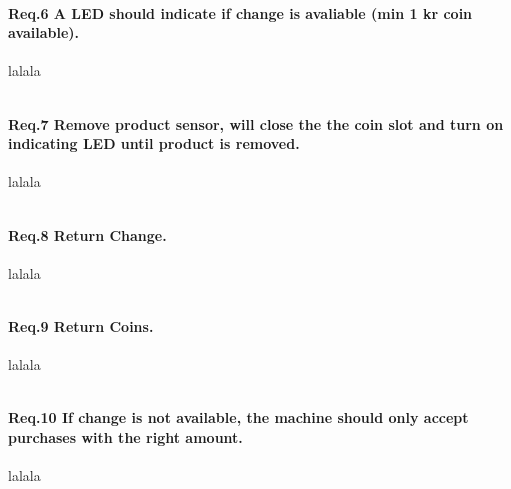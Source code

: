 \paragraph{Req.6 A LED should indicate if change is avaliable (min 1 kr coin available).}
lalala
\begin{lstlisting}[caption={[VHDL]eks. text }]

\end{lstlisting}
 

\paragraph{Req.7 Remove product sensor, will close the the coin slot and turn on indicating LED until product is removed.}
lalala
\begin{lstlisting}[caption={[VHDL]eks. text }]

\end{lstlisting}  


\paragraph{Req.8 Return Change.}
lalala
\begin{lstlisting}[caption={[VHDL]eks. text }]

\end{lstlisting}
 

\paragraph{Req.9 Return Coins.}
lalala
\begin{lstlisting}[caption={[VHDL]eks. text }]

\end{lstlisting}


\paragraph{Req.10 If change is not available, the machine should only accept purchases with the right amount.}
lalala
\begin{lstlisting}[caption={[VHDL]eks. text }]

\end{lstlisting}


